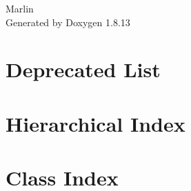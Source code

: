 \documentclass[twoside]{book}
\newcommand{\+}{\discretionary{\mbox{\scriptsize$\hookleftarrow$}}{}{}}
\newcommand{\clearemptydoublepage}{%
  \newpage{\pagestyle{empty}\cleardoublepage}%
}
\begin{document}
\begin{titlepage}
\vspace*{7cm}
\begin{center}%
{\Large Marlin }\\
\vspace*{1cm}
{\large Generated by Doxygen 1.8.13}\\
\end{center}
\end{titlepage}
\clearemptydoublepage
{}
\tableofcontents
\clearemptydoublepage
{}

\chapter{Deprecated List}
\label{deprecated}

\chapter{Hierarchical Index}

\chapter{Class Index}

\end{document}
